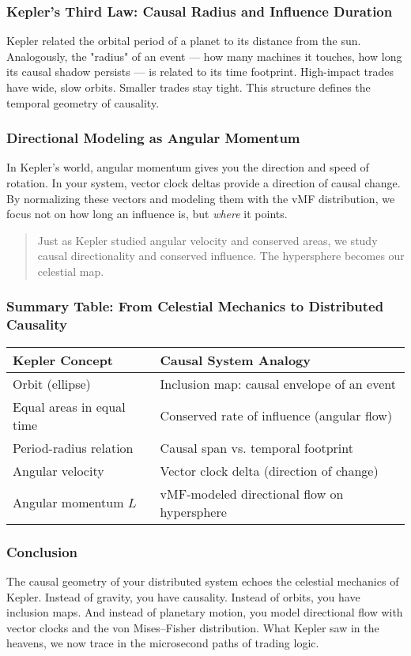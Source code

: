 \subsubsection{Kepler’s Third Law: Causal Radius and Influence Duration}

Kepler related the orbital period of a planet to its distance from the sun. Analogously, the "radius" of an event — how many machines it touches, how long its causal shadow persists — is related to its time footprint. High-impact trades have wide, slow orbits. Smaller trades stay tight. This structure defines the temporal geometry of causality.

\subsubsection{Directional Modeling as Angular Momentum}

In Kepler’s world, angular momentum gives you the direction and speed of rotation. In your system, vector clock deltas provide a direction of causal change. By normalizing these vectors and modeling them with the vMF distribution, we focus not on how long an influence is, but \emph{where} it points. 

\begin{quote}
Just as Kepler studied angular velocity and conserved areas, we study causal directionality and conserved influence. The hypersphere becomes our celestial map.
\end{quote}

\subsubsection{Summary Table: From Celestial Mechanics to Distributed Causality}

\begin{center}
\begin{tabular}{ll}
\textbf{Kepler Concept} & \textbf{Causal System Analogy} \\
\toprule
Orbit (ellipse) & Inclusion map: causal envelope of an event \\
Equal areas in equal time & Conserved rate of influence (angular flow) \\
Period-radius relation & Causal span vs. temporal footprint \\
Angular velocity & Vector clock delta (direction of change) \\
Angular momentum $L$ & vMF-modeled directional flow on hypersphere \\
\bottomrule
\end{tabular}
\end{center}

\subsubsection{Conclusion}

The causal geometry of your distributed system echoes the celestial mechanics of Kepler. Instead of gravity, you have causality. Instead of orbits, you have inclusion maps. And instead of planetary motion, you model directional flow with vector clocks and the von Mises--Fisher distribution. What Kepler saw in the heavens, we now trace in the microsecond paths of trading logic.
